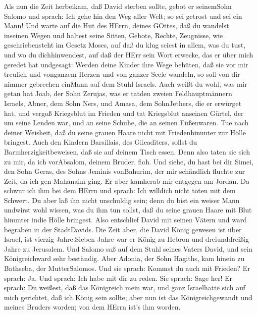  Als nun die Zeit herbeikam, daß David sterben sollte, gebot
er seinemSohn Salomo und sprach:  Ich gehe hin den Weg aller
Welt; so sei getrost und sei ein Mann!  Und warte auf die
Hut des HErrn, deines GOttes, daß du wandelst inseinen Wegen und haltest
seine Sitten, Gebote, Rechte, Zeugnisse, wie geschriebensteht im Gesetz
Moses, auf daß du klug seiest in allem, was du tust, und wo du
dichhinwendest,  auf daß der HErr sein Wort erwecke, das er
über mich geredet hat undgesagt: Werden deine Kinder ihre Wege behüten,
daß sie vor mir treulich und vonganzem Herzen und von ganzer Seele
wandeln, so soll von dir nimmer gebrechen einMann auf dem Stuhl Israels.
 Auch weißt du wohl, was mir getan hat Joab, der Sohn
Zerujas, was er tatden zweien Feldhauptmännern Israels, Abner, dem Sohn
Ners, und Amasa, dem SohnJethers, die er erwürget hat, und vergoß
Kriegsblut im Frieden und tat Kriegsblut anseinen Gürtel, der um seine
Lenden war, und an seine Schuhe, die an seinen Füßenwaren. 
Tue nach deiner Weisheit, daß du seine grauen Haare nicht mit
Friedenhinunter zur Hölle bringest.  Auch den Kindern
Barsillais, des Gileaditers, sollst du Barmherzigkeitbeweisen, daß sie
auf deinem Tisch essen. Denn also taten sie sich zu mir, da ich
vorAbsalom, deinem Bruder, floh.  Und siehe, du hast bei dir
Simei, den Sohn Geras, des Sohns Jeminis vonBahurim, der mir schändlich
fluchte zur Zeit, da ich gen Mahanaim ging. Er aber kamherab mir
entgegen am Jordan. Da schwur ich ihm bei dem HErrn und sprach: Ich
willdich nicht töten mit dem Schwert.  Du aber laß ihn nicht
unschuldig sein; denn du bist ein weiser Mann undwirst wohl wissen, was
du ihm tun sollst, daß du seine grauen Haare mit Blut hinunter indie
Hölle bringest.  Also entschlief David mit seinen Vätern
und ward begraben in der StadtDavids.  Die Zeit aber, die
David König gewesen ist über Israel, ist vierzig Jahre.Sieben Jahre war
er König zu Hebron und dreiunddreißig Jahre zu Jerusalem. 
Und Salomo saß auf dem Stuhl seines Vaters David, und sein
Königreichward sehr beständig.  Aber Adonia, der Sohn
Hagiths, kam hinein zu Bathseba, der MutterSalomos. Und sie sprach:
Kommst du auch mit Frieden? Er sprach: Ja.  Und sprach: Ich
habe mit dir zu reden. Sie sprach: Sage her!  Er sprach: Du
weißest, daß das Königreich mein war, und ganz Israelhatte sich auf mich
gerichtet, daß ich König sein sollte; aber nun ist das Königreichgewandt
und meines Bruders worden; von dem HErrn ist's ihm worden. 
